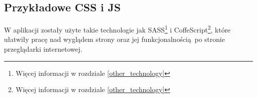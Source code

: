     


    \subsection{Przykładowe CSS i JS}
      W aplikacji zostały użyte takie technologie jak SASS\footnote{Więcej informacji w rozdziale \ref{other_technology}} i CoffeScript\footnote{Więcej informacji w rozdziale \ref{other_technology}}, które ułatwiły pracę nad wyglądem strony oraz jej funkcjonalnością po stronie przeglądarki internetowej.\\

